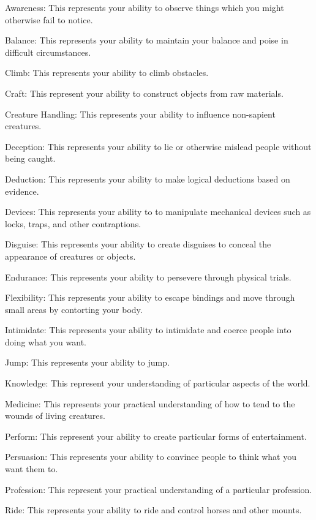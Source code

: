   \begin{raggeditemize}
    \item Awareness: This represents your ability to observe things which you might otherwise fail to notice.
    \item Balance: This represents your ability to maintain your balance and poise in difficult circumstances.
    \item Climb: This represents your ability to climb obstacles.
    \item Craft: This represent your ability to construct objects from raw materials.
    \item Creature Handling: This represents your ability to influence non-sapient creatures.
    \item Deception: This represents your ability to lie or otherwise mislead people without being caught.
    \item Deduction: This represents your ability to make logical deductions based on evidence.
    \item Devices: This represents your ability to to manipulate mechanical devices such as locks, traps, and other contraptions.
    \item Disguise: This represents your ability to create disguises to conceal the appearance of creatures or objects.
    \item Endurance: This represents your ability to persevere through physical trials.
    \item Flexibility: This represents your ability to escape bindings and move through small areas by contorting your body.
    \item Intimidate: This represents your ability to intimidate and coerce people into doing what you want.
    \item Jump: This represents your ability to jump.
    \item Knowledge: This represent your understanding of particular aspects of the world.
    \item Medicine: This represents your practical understanding of how to tend to the wounds of living creatures.
    \item Perform: This represent your ability to create particular forms of entertainment.
    \item Persuasion: This represents your ability to convince people to think what you want them to.
    \item Profession: This represent your practical understanding of a particular profession.
    \item Ride: This represents your ability to ride and control horses and other mounts.

\end{raggeditemize}
